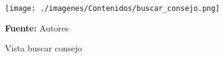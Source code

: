 \begin{figure}[!htb]
  \begin{center}
\texttt{[image: ./imagenes/Contenidos/buscar\_consejo.png]}
    \caption{Vista buscar consejo}
    \label{fig:Vista_buscar_consejo}
    \textbf{Fuente:}  Autores
  \end{center}
\end{figure}
